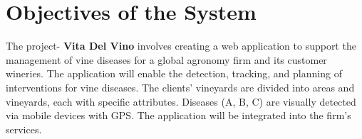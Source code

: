 \section{Objectives of the System}
The project- \textbf{Vita Del Vino} involves creating a web application to support the management of vine diseases for a global agronomy 
firm and its customer wineries. The application will enable the detection, tracking, and planning of interventions 
for vine diseases. The clients' vineyards are divided into areas and vineyards, each with specific attributes. Diseases (A, B, C) are 
visually detected via mobile devices with GPS. 
The application will be integrated into the firm's services.
